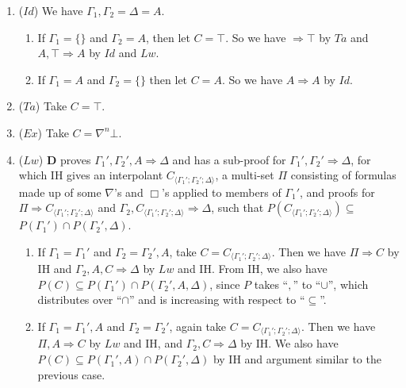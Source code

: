 \begin{enumerate}
	\item ($Id$) We have $\Gamma_1,\Gamma_2 = \Delta = A$.
	\begin{enumerate}
		\item If $\Gamma_1 = \{\}$ and $\Gamma_2 = A$, then let $C = \top$. So we have $\Rightarrow \top$ by $Ta$ and $A , \top \Rightarrow A$ by $Id$ and $Lw$.

		\item If $\Gamma_1 = A$ and $\Gamma_2 = \{\}$ then let $C = A$. So we have $A \Rightarrow A$ by $Id$.
	\end{enumerate}
	\item ($Ta$) Take $C = \top$.

	\item ($Ex$) Take $C = \nabla^n \bot$.

	\item ($Lw$) $\mathbf{D}$ proves $\Gamma_1' , \Gamma_2' , A \Rightarrow \Delta$ and has a sub-proof for $\Gamma_1' , \Gamma_2' \Rightarrow \Delta$, for which IH gives an interpolant $C_{\langle\Gamma_1';\Gamma_2';\Delta\rangle}$, a multi-set $\Pi$ consisting of formulas made up of some $\nabla$'s and $\Box$'s applied to members of $\Gamma_1'$, and proofs for $\Pi \Rightarrow C_{\langle\Gamma_1';\Gamma_2';\Delta\rangle}$ and $\Gamma_2 , C_{\langle\Gamma_1';\Gamma_2';\Delta\rangle} \Rightarrow \Delta$, such that $P(C_{\langle\Gamma_1';\Gamma_2';\Delta\rangle}) \subseteq$ $ P(\Gamma_1') \cap P(\Gamma_2' , \Delta)$.
	\begin{enumerate}
		\item If $\Gamma_1 = \Gamma_1'$ and $\Gamma_2 = \Gamma_2' , A$, take $C = C_{\langle\Gamma_1';\Gamma_2';\Delta\rangle}$. Then we have  $\Pi \Rightarrow C$ by IH and $\Gamma_2 , A , C \Rightarrow \Delta$ by $Lw$ and IH. From IH, we also have $P(C) \subseteq P(\Gamma_1') \cap P(\Gamma_2' , A , \Delta)$, since $P$ takes ``$,$'' to ``$\cup$'', which distributes over ``$\cap$'' and is increasing with respect to ``$\subseteq$''.

		\item If $\Gamma_1 = \Gamma_1' , A$ and $\Gamma_2 = \Gamma_2'$, again take $C = C_{\langle\Gamma_1';\Gamma_2';\Delta\rangle}$. Then we have  $\Pi , A \Rightarrow C$ by $Lw$ and IH, and $\Gamma_2 , C \Rightarrow \Delta$ by IH. We also have $P(C) \subseteq P(\Gamma_1' , A) \cap P(\Gamma_2' , \Delta)$ by IH and argument similar to the previous case.
	\end{enumerate}


\end{enumerate}
